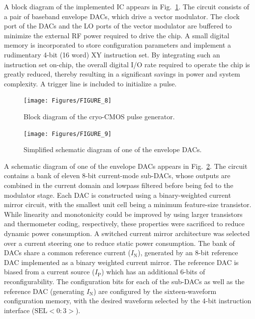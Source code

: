 \documentclass[journal]{IEEEtran}
\newcommand{\CR}[1]{{\color{black}#1}}
\begin{document}
A block diagram of the implemented IC appears in Fig.~\ref{chipbd}. The circuit consists of a pair of baseband envelope DACs, which drive a vector modulator. The clock port of the DACs and the LO ports of the vector modulator are buffered to minimize the external RF power required to drive the chip. A small digital memory is incorporated to store configuration parameters and implement a rudimentary 4-bit (\CR{16 word}) XY instruction set. By integrating such an instruction set on-chip, the overall digital I/O rate required to operate the chip is greatly reduced, thereby resulting in a significant savings in power and system complexity. A trigger line is included to initialize a pulse.
\begin{figure}[bt!]
\texttt{[image: Figures/FIGURE\_8]}
\caption{Block diagram of the cryo-CMOS pulse generator.}\label{chipbd}
\end{figure}
\begin{figure}
\texttt{[image: Figures/FIGURE\_9]}
\caption{Simplified schematic diagram of one of the envelope DACs.}
\label{EnvD}
\end{figure}

A schematic diagram of one of the envelope DACs appears in Fig.~\ref{EnvD}. The circuit contains a bank of eleven 8-bit current-mode sub-DACs, whose outputs are combined in the current domain and lowpass filtered before being fed to the modulator stage. Each DAC is constructed using a binary-weighted current mirror circuit, with the smallest unit cell being a minimum feature-size transistor. While linearity and monotonicity could be improved by using larger transistors and thermometer coding, respectively, these properties were sacrificed to reduce dynamic power consumption. \CR{A switched current mirror architecture was selected over a current steering one to reduce static power consumption.} The bank of DACs share a common reference current ($I_\text{N}$), \CR{generated by an 8-bit reference DAC implemented as a binary weighted current mirror}. \CR{The reference DAC is} biased from a current source ($I_\text{P}$) which has an additional 6-bits of reconfigurability. The configuration bits for each of the sub-DACs as well as \CR{the reference DAC (generating} $I_\text{N}$) are configured by the sixteen-waveform configuration memory, with the desired waveform  selected by the 4-bit instruction interface ($\mathrm{SEL<0:3>}$). %
\end{document}
